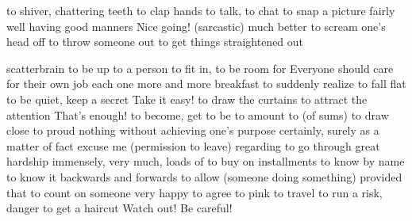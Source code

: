 {to shiver, chattering teeth}
{to clap hands}
{to talk, to chat}
{to snap a picture}
{fairly well}
{having good manners}
{Nice going! (sarcastic)}
{much better}
{to scream one’s head off}
{to throw someone out}
{to get things straightened out}

{scatterbrain}
{to be up to a person}
{to fit in, to be room for}
{Everyone should care for their own job}
{each one}
{more and more}
{breakfast}
{to suddenly realize}
{to fall flat}
{to be quiet, keep a secret}
{Take it easy!}
{to draw the curtains}
{to attract the attention}
{That’s enough!}
{to become, get to be}
{to amount to (of sums)}
{to draw close to}
{proud}
{nothing}
{without achieving one’s purpose}
{certainly, surely}
{as a matter of fact}
{excuse me (permission to leave)}
{regarding}
{to go through great hardship}
{immensely, very much, loads of}
{to buy on installments}
{to know by name}
{to know it backwards and forwards}
{to allow (someone doing something)}
{provided that}
{to count on someone}
{very happy}
{to agree to}
{pink}
{to travel}
{to run a risk, danger}
{to get a haircut}
{Watch out! Be careful!}

